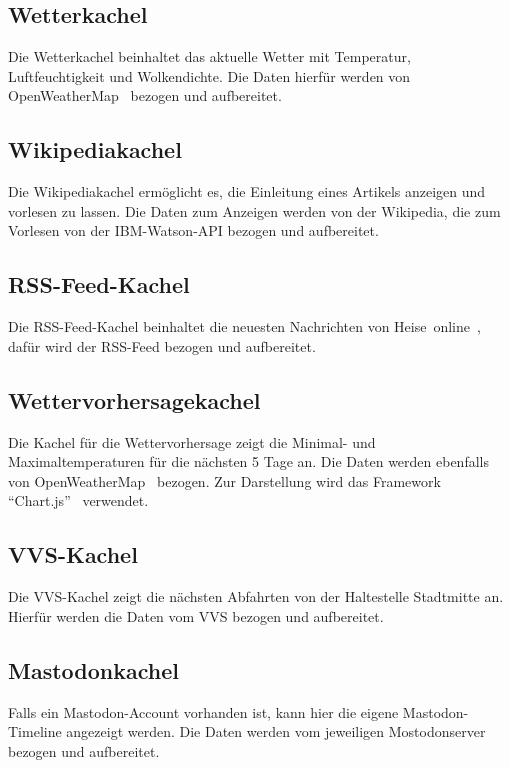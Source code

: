 \documentclass[fleqn,10pt]{SelfArx} %
\begin{document}
\subsection{Wetterkachel}
Die Wetterkachel beinhaltet das aktuelle Wetter mit Temperatur, Luftfeuchtigkeit und Wolkendichte. Die Daten hierfür werden von OpenWeatherMap~\cite{owm} bezogen und aufbereitet.
\subsection{Wikipediakachel}
Die Wikipediakachel ermöglicht es, die Einleitung eines Artikels anzeigen und vorlesen zu lassen. Die Daten zum Anzeigen werden von der Wikipedia, die zum Vorlesen von der IBM-Watson-API bezogen und aufbereitet.
\subsection{RSS-Feed-Kachel}
Die RSS-Feed-Kachel beinhaltet die neuesten Nachrichten von Heise~online~\cite{heise}, dafür wird der RSS-Feed bezogen und aufbereitet.
\subsection{Wettervorhersagekachel}
Die Kachel für die Wettervorhersage zeigt die Minimal- und Maximaltemperaturen für die nächsten 5 Tage an. Die Daten werden ebenfalls von OpenWeatherMap~\cite{owm} bezogen. Zur Darstellung wird das Framework \enquote{Chart.js}~\cite{chartjs} verwendet.
\subsection{VVS-Kachel}
Die VVS-Kachel zeigt die nächsten Abfahrten von der Haltestelle Stadtmitte an. Hierfür werden die Daten vom VVS bezogen und aufbereitet.
\subsection{Mastodonkachel}
Falls ein Mastodon-Account vorhanden ist, kann hier die eigene Mastodon-Timeline angezeigt werden. Die Daten werden vom jeweiligen Mostodonserver bezogen und aufbereitet.
\end{document}
